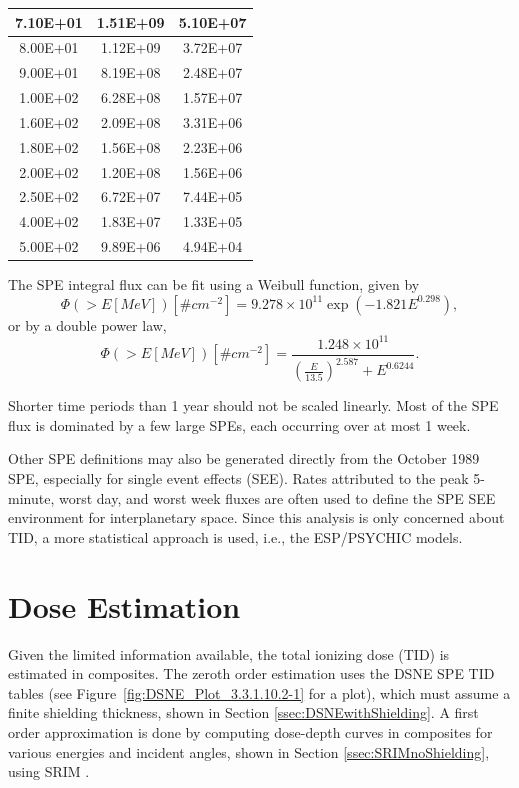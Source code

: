 \documentclass{hitec}
\begin{document}
\begin{table}[h]
{\begin{tabular}{|c|c|c|}
			7.10E+01 & 1.51E+09 & 5.10E+07 \\ \hline
			8.00E+01 & 1.12E+09 & 3.72E+07 \\ \hline
			9.00E+01 & 8.19E+08 & 2.48E+07 \\ \hline
			1.00E+02 & 6.28E+08 & 1.57E+07 \\ \hline
			1.60E+02 & 2.09E+08 & 3.31E+06 \\ \hline
			1.80E+02 & 1.56E+08 & 2.23E+06 \\ \hline
			2.00E+02 & 1.20E+08 & 1.56E+06 \\ \hline
			2.50E+02 & 6.72E+07 & 7.44E+05 \\ \hline
			4.00E+02 & 1.83E+07 & 1.33E+05 \\ \hline
			5.00E+02 & 9.89E+06 & 4.94E+04 \\ \hline
		\end{tabular}%
	}

\end{table}

The SPE integral flux can be fit using a Weibull function, given by
\begin{equation}
\Phi(>E[MeV]) [\# cm^{-2}] = 9.278\times 10^{11} \exp\left(-1.821E^{0.298}\right),
\end{equation}
or by a double power law,
\begin{equation}
\Phi(>E[MeV]) [\# cm^{-2}] = \frac{1.248\times 10^{11}}{\left(\frac{E}{13.5}\right)^{2.587} + E^{0.6244}}.
\end{equation}

Shorter time periods than 1 year should not be scaled linearly. Most of the SPE flux is dominated by a few large SPEs, each occurring over at most 1 week.

Other SPE definitions may also be generated directly from the October 1989 SPE, especially for single event effects (SEE). Rates attributed to the peak 5-minute, worst day, and worst week fluxes are often used to define the SPE SEE environment for interplanetary space. Since this analysis is only concerned about TID, a more statistical approach is used, i.e., the ESP/PSYCHIC models.

\section{Dose Estimation}

Given the limited information available, the total ionizing dose (TID) is estimated in composites. The zeroth order estimation uses the DSNE SPE TID tables (see Figure~\ref{fig:DSNE_Plot_3.3.1.10.2-1} for a plot), which must assume a finite shielding thickness, shown in Section \ref{ssec:DSNEwithShielding}. A first order approximation is done by computing dose-depth curves in composites for various energies and incident angles, shown in Section \ref{ssec:SRIMnoShielding}, using SRIM \citep{ziegler2009srim}.
\end{document}
